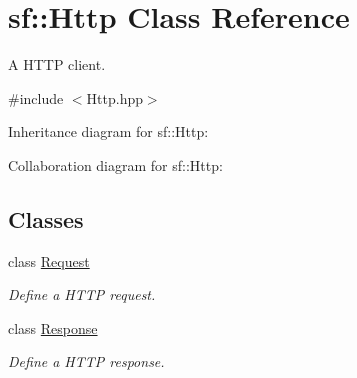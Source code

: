\hypertarget{classsf_1_1_http}{}\section{sf\+:\+:Http Class Reference}
\label{classsf_1_1_http}


A H\+T\+TP client.  




{\ttfamily \#include $<$Http.\+hpp$>$}



Inheritance diagram for sf\+:\+:Http\+:


Collaboration diagram for sf\+:\+:Http\+:
\subsection*{Classes}
\begin{DoxyCompactItemize}
\item 
class \hyperlink{classsf_1_1_http_1_1_request}{Request}
\begin{DoxyCompactList}\small\item\em Define a H\+T\+TP request. \end{DoxyCompactList}\item 
class \hyperlink{classsf_1_1_http_1_1_response}{Response}
\begin{DoxyCompactList}\small\item\em Define a H\+T\+TP response. \end{DoxyCompactList}\end{DoxyCompactItemize}
